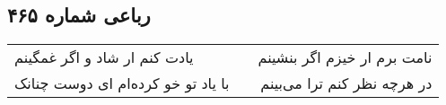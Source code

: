 \begin{center}
\section*{رباعی شماره ۴۶۵}
\label{sec:sh465}
\begin{longtable}{l p{0.5cm} r}
یادت کنم ار شاد و اگر غمگینم
&&
نامت برم ار خیزم اگر بنشینم
\\
با یاد تو خو کرده‌ام ای دوست چنانک
&&
در هرچه نظر کنم ترا می‌بینم
\\
\end{longtable}
\end{center}
